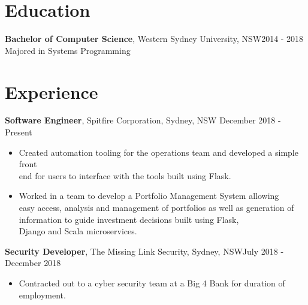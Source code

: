 \documentclass[margin]{res}
\begin{document}

\address{{\bf Present Address} \\ 26/23-25 John Street\\ Lidcombe, NSW 2141}
\address{{\bf Contact Details} \\ ben.hili1994@gmail.com \\ +61414329597}


\begin{resume}

\section{Education}
	{\bf Bachelor of Computer Science}, Western Sydney University, NSW\hfill 2014 - 2018\\ 
	Majored in Systems Programming

\section{Experience}
{\bf Software Engineer}, 
	Spitfire Corporation, Sydney, NSW \hfill December 2018 - Present
\begin{itemize} \itemsep 0pt  %
\item Created automation tooling for the operations team and developed a simple front \\
	end for users to interface with the tools built using Flask.

\item Worked in a team to develop a Portfolio Management System allowing \\
	easy access, analysis and management of portfolios as well as generation of \\
		information to guide investment decisions built using Flask, \\ 
			Django and Scala microservices.
	
\end{itemize}

{\bf Security Developer}, 
	The Missing Link Security, Sydney, NSW\hfill July 2018 - December 2018
\begin{itemize} \itemsep 0pt  %
\item Contracted out to a cyber security team at a Big 4 Bank for duration of \\
	employment.


\end{itemize}
\end{resume}
\end{document}
